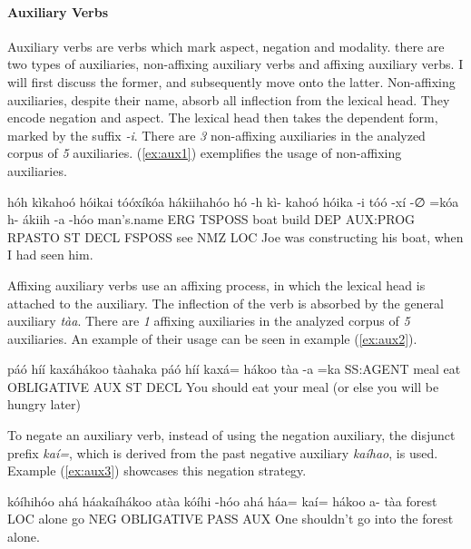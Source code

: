 \documentclass[a4paper, 12pt, oneside]{memoir}
\newcommand{\emh}[1]{\textit{#1}}
\begin{document}
\paragraph{Auxiliary Verbs}
Auxiliary verbs are verbs which mark aspect, negation and modality. there are two types of auxiliaries, non-affixing auxiliary verbs and affixing auxiliary verbs. I will first discuss the former, and subsequently move onto the latter. Non-affixing auxiliaries, despite their name, absorb all inflection from the lexical head. They encode negation and aspect. The lexical head then takes the dependent form, marked by the suffix \emh{-i}. There are \textit{3} non-affixing auxiliaries in the analyzed corpus of \textit{5} auxiliaries. (\ref{ex:aux1}) exemplifies the usage of non-affixing auxiliaries.
\begin{examples}
    \ex \label{ex:aux1}
    \words hóh kìkahoó hóikai tóóxíkóa hákiihahóo
    \bits hó -h kì- kahoó hóika -i tóó -xí -∅ =kóa h- ákiih -a -hóo
    \gloss man's.name ERG TSPOSS boat build DEP AUX:PROG RPASTO ST DECL FSPOSS see NMZ LOC
    \tr Joe was constructing his boat, when I had seen him.
\end{examples}
Affixing auxiliary verbs use an affixing process, in which the lexical head is attached to the auxiliary. The inflection of the verb is absorbed by the general auxiliary \emh{tàa}. There are \textit{1} affixing auxiliaries in the analyzed corpus of \textit{5} auxiliaries. An example of their usage can be seen in example (\ref{ex:aux2}).
\begin{examples}
    \ex \label{ex:aux2}
    \words páó híí kaxáhákoo tàahaka
    \bits páó híí kaxá= hákoo tàa -a =ka 
    \gloss SS:AGENT meal eat OBLIGATIVE AUX ST DECL
    \tr You should eat your meal (or else you will be hungry later)
\end{examples}
To negate an auxiliary verb, instead of using the negation auxiliary, the disjunct prefix \emh{kaí=}, which is derived from the past negative auxiliary \emh{kaíhao}, is used. Example (\ref{ex:aux3}) showcases this negation strategy.
\begin{examples}
    \ex \label{ex:aux3}
    \words kóíhihóo ahá háakaíhákoo atàa
    \bits kóíhi -hóo ahá háa= kaí= hákoo a- tàa 
    \gloss forest LOC alone go NEG OBLIGATIVE PASS AUX
    \tr One shouldn't go into the forest alone.
\end{examples}
\end{document}
